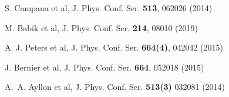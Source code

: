 \begin{thebibliography}{}
%
%


S. Campana et al, J. Phys. Conf. Ser. {\bf513}, 062026 (2014)



M. Babik et al, J. Phys. Conf. Ser. {\bf214}, 08010 (2019)

 A. J. Peters et al, J. Phys. Conf. Ser. {\bf664(4)}, 042042 (2015)




J. Bernier et al, J. Phys. Conf. Ser. {\bf664}, 052018 (2015)





A.~A. Ayllon et al, 
J. Phys. Conf. Ser. {\bf 513(3)} 032081 (2014)










\end{thebibliography}
